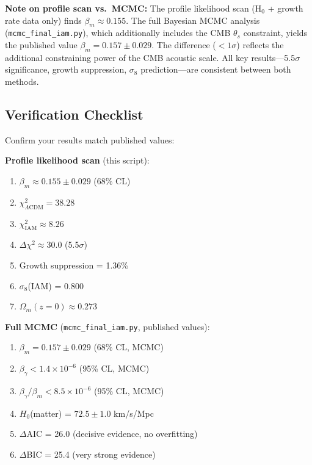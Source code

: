 \documentclass[11pt]{article}
\begin{document}
\noindent\textbf{Note on profile scan vs.\ MCMC:} The profile likelihood scan (H$_0$ + growth rate data only) finds $\beta_m \approx 0.155$. The full Bayesian MCMC analysis (\texttt{mcmc\_final\_iam.py}), which additionally includes the CMB $\theta_s$ constraint, yields the published value $\beta_m = 0.157 \pm 0.029$. The difference ($<1\sigma$) reflects the additional constraining power of the CMB acoustic scale. All key results---5.5$\sigma$ significance, growth suppression, $\sigma_8$ prediction---are consistent between both methods.

\subsection{Verification Checklist}

Confirm your results match published values:

\noindent\textbf{Profile likelihood scan} (this script):
\begin{enumerate}
    \item[$\square$] $\beta_m \approx 0.155 \pm 0.029$ (68\% CL)
    \item[$\square$] $\chi^2_{\Lambda\text{CDM}} = 38.28$
    \item[$\square$] $\chi^2_{\text{IAM}} \approx 8.26$
    \item[$\square$] $\Delta\chi^2 \approx 30.0$ (5.5$\sigma$)
    \item[$\square$] Growth suppression = 1.36\%
    \item[$\square$] $\sigma_8$(IAM) = 0.800
    \item[$\square$] $\Omega_m(z=0) \approx 0.273$
\end{enumerate}

\noindent\textbf{Full MCMC} (\texttt{mcmc\_final\_iam.py}, published values):
\begin{enumerate}
    \item[$\square$] $\beta_m = 0.157 \pm 0.029$ (68\% CL, MCMC)
    \item[$\square$] $\beta_\gamma < 1.4 \times 10^{-6}$ (95\% CL, MCMC)
    \item[$\square$] $\beta_\gamma/\beta_m < 8.5 \times 10^{-6}$ (95\% CL, MCMC)
    \item[$\square$] $H_0$(matter) = $72.5 \pm 1.0$ km/s/Mpc
    \item[$\square$] $\Delta$AIC = 26.0 (decisive evidence, no overfitting)
    \item[$\square$] $\Delta$BIC = 25.4 (very strong evidence)
\end{enumerate}
\end{document}
